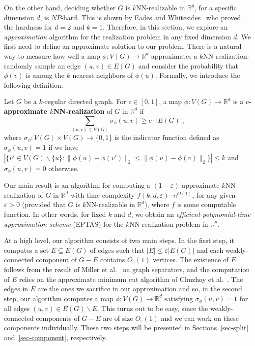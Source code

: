 \documentclass[english]{lipics-v2021}
\begin{document}
On the other hand, deciding whether $G$ is $k$NN-realizable in $\mathbb{R}^d$, for a specific dimension $d$, is $NP$-hard. This is shown by Eades and Whitesides~\cite{eades:1996} who proved the hardness for $d=2$ and $k=1$.
Therefore, in this section, we explore an \textit{approximation} algorithm for the realization problem in any fixed dimension $d$.
We first need to define an approximate solution to our problem.
There is a natural way to measure how well a map $\phi: V(G) \rightarrow \mathbb{R}^d$ approximates a $k$NN-realization: randomly sample an edge $(u,v) \in E(G)$ and consider the probability that $\phi(v)$ is among the $k$ nearest neighbors of $\phi(u)$.
Formally, we introduce the following definition.
\begin{definition} \label{def-apprxreal}
Let $G$ be a $k$-regular directed graph.
For $c \in [0,1]$, a map $\phi:V(G) \rightarrow \mathbb{R}^d$ is a \textbf{$c$-approximate $k$NN-realization} of $G$ in $\mathbb{R}^d$ if 
\begin{equation*}
    \sum_{(u,v) \in E(G)} \sigma_\phi(u,v) \geq c \cdot |E(G)|,
\end{equation*}
where $\sigma_\phi: V(G) \times V(G) \rightarrow \{0,1\}$ is the indicator function defined as $\sigma_\phi(u,v) = 1$ if we have $|\{v' \in V(G) \backslash \{u\}: \lVert \phi(u)-\phi(v') \rVert_2 \leq \lVert \phi(u)-\phi(v) \rVert_2 \}| \leq k$ and $\sigma_\phi(u,v) = 0$ otherwise.
\end{definition}

Our main result is an algorithm for computing a $(1-\varepsilon)$-approximate $k$NN-realization of $G$ in $\mathbb{R}^d$ with time complexity $f(k,d,\varepsilon) \cdot n^{O(1)}$, for any given $\varepsilon > 0$ (provided that $G$  is $k$NN-realizable in $\mathbb{R}^d$), where $f$ is some computable function.
In other words, for fixed $k$ and $d$, we obtain an \textit{efficient polynomial-time approximation scheme} (EPTAS) for the $k$NN-realization problem in $\mathbb{R}^d$.

At a high level, our algorithm consists of two main steps.
In the first step, it computes a set $E \subseteq E(G)$ of edges such that $|E| \leq \varepsilon |E(G)|$ and each weakly-connected component of $G - E$ contains $O_\varepsilon(1)$ vertices.
The existence of $E$ follows from the result of Miller et al.~\cite{miller:1997} on graph separators, and the computation of $E$ relies on the approximate minimum cut algorithm of Chuzhoy et al.~\cite{chuzhoy2020deterministic}.
The edges in $E$ are the ones we sacrifice in our approximation and so, in the second step, our algorithm computes a map $\phi:V(G) \rightarrow \mathbb{R}^d$ satisfying $\sigma_\phi(u,v) = 1$ for all edges $(u,v) \in E(G) \backslash E$.
This turns out to be easy, since the weakly-connected components of $G - E$ are of size $O_\varepsilon(1)$ and we can work on these components individually.
These two steps will be presented in Sections~\ref{sec-split} and~\ref{sec-component}, respectively.
\end{document}
